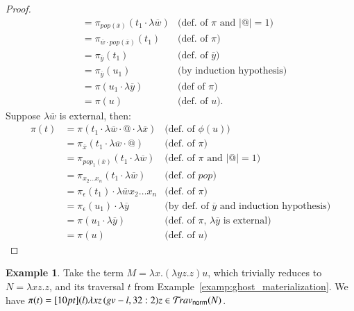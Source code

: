 \documentclass{elsarticle}
\theoremstyle{plain}
\theoremstyle{definition}
\newtheorem{example}{Example}[section]
\newcommand{\normalizing}{{\sf norm}}
\newcommand{\travsetnorm}{\travset_\normalizing} %
\def\coresymbol{\pi} %
\begin{document}
\begin{proof}
\begin{align*}
        &=  \coresymbol_{pop(\overline{x})}(t_1 \cdot
        \lambda\overline{w})
            & \mbox{(def.~of $\coresymbol$ and $|@|=1$)}
        \\
        &=  \coresymbol_{\overline{w} \cdot pop(\overline{x})}(t_1)
            & \mbox{(def.~of $\coresymbol$)}
        \\
        &=  \coresymbol_{\overline{y}}(t_1)
            & \mbox{(def.~of $\overline{y}$)}
        \\
        &=  \coresymbol_{\overline{y}}(u_1)
            & \mbox{(by induction hypothesis)}
        \\
        &= \coresymbol(u_1 \cdot \lambda\overline{y}) & \mbox{(def of $\coresymbol$)} \\
        &=  \coresymbol(u)
            & \mbox{(def.~of $u$).}
    \end{align*}
    Suppose $\lambda\overline{w}$ is external, then:
    \begin{align*}
        \coresymbol(t)
        &=  \coresymbol(t_1 \cdot \lambda\overline{w} \cdot @ \cdot \lambda\overline{x})
            & \mbox{(def.~of $\phi(u)$)}
        \\
        &=  \coresymbol_{\overline{x}}(t_1 \cdot
        \lambda\overline{w} \cdot @)
            & \mbox{(def.~of $\coresymbol$)}
        \\
        &=  \coresymbol_{pop_1(\overline{x})}(t_1 \cdot \lambda\overline{w})
            & \mbox{(def.~of $\coresymbol$ and $|@|=1$)}
        \\
        &=  \coresymbol_{x_2\ldots x_n}(t_1 \cdot \lambda\overline{w})
        & \mbox{(def.~of $pop$)}
        \\
        &=  \coresymbol_{\epsilon}(t_1) \cdot \lambda\overline{w} x_2\ldots x_n
            & \mbox{(def.~of $\coresymbol$)}
        \\
            &= \coresymbol_{\epsilon}(u_1) \cdot \lambda\overline{y}
            & \mbox{(by def.~of $\overline{y}$ and induction hypothesis)}
        \\
        &= \coresymbol(u_1 \cdot \lambda\overline{y})
            & \mbox{(def.~of $\coresymbol$, $\lambda\overline{y}$ is external)}
        \\
        &= \coresymbol(u)
            & \mbox{(def.~of $u$)}
    \end{align*}
\fi
\end{proof}

\begin{example}
    Take the term $M = \lambda x. (\lambda y z.z) u$, which trivially reduces to $N = \lambda x z . z$, and its traversal $t$ from Example~\ref{examp:ghost_materialization}.
    We have $\coresymbol(t) = \Pstr[10pt]{ (l){\lambda x z} \, (gv-l,32:2){z} } \in \travsetnorm(N)$.
\end{example}
\end{document}
